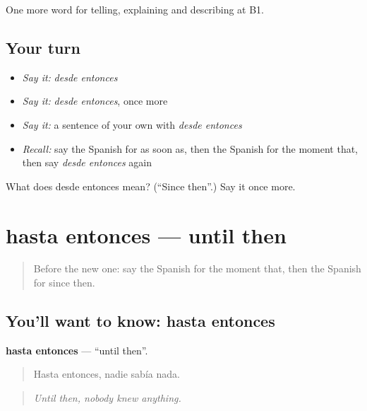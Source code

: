 \begin{grammarlens}[title={What you've built}]
One more word for telling, explaining and describing at B1.
\end{grammarlens}

\subsection*{Your turn}
\begin{itemize}
\raggedright
  \item \emph{Say it:} \emph{desde entonces}
  \item \emph{Say it:} \emph{desde entonces}, once more
  \item \emph{Say it:} a sentence of your own with \emph{desde entonces}
  \item \emph{Recall:} say the Spanish for as soon as, then the Spanish for the moment that, then say \emph{desde entonces} again
\end{itemize}

\begin{tcolorbox}[breakable,colback=teal!4,colframe=teal!35!black,title={Before you move on}]
What does desde entonces mean? (\textquotedblleft{}Since then\textquotedblright{}.) Say it once more.
\end{tcolorbox}
\section[hasta entonces]{hasta entonces — until then}

\label{lesson:ES-C537-hasta-entonces}



\begin{quote}
Before the new one: say the Spanish for the moment that, then the Spanish for since then.
\end{quote}

\subsection*{You'll want to know: hasta entonces}
\textbf{hasta entonces} — \textquotedblleft{}until then\textquotedblright{}.

\begin{quote}
Hasta entonces, nadie sabía nada.
\end{quote}

\begin{quote}
\emph{Until then, nobody knew anything.}
\end{quote}

